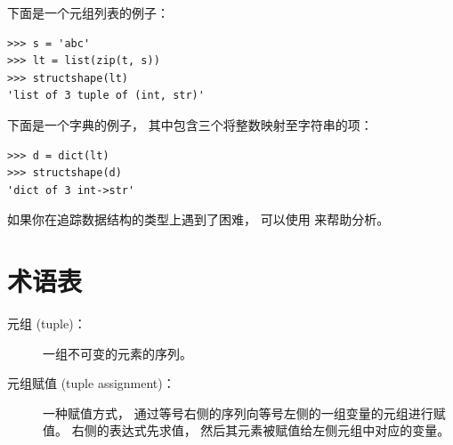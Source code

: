 {%

下面是一个元组列表的例子：

\begin{lstlisting}
>>> s = 'abc'
>>> lt = list(zip(t, s))
>>> structshape(lt)
'list of 3 tuple of (int, str)'
\end{lstlisting}

%

下面是一个字典的例子， 其中包含三个将整数映射至字符串的项：

\begin{lstlisting}
>>> d = dict(lt)
>>> structshape(d)
'dict of 3 int->str'
\end{lstlisting}

%

如果你在追踪数据结构的类型上遇到了困难， 可以使用  来帮助分析。

\section{术语表}

\begin{description}


\item[元组 (tuple)：] 一组不可变的元素的序列。


\item[元组赋值 (tuple assignment)：] 一种赋值方式， 通过等号右侧的序列向等号左侧的一组变量的元组进行赋值。
右侧的表达式先求值， 然后其元素被赋值给左侧元组中对应的变量。
 



\end{description}}
